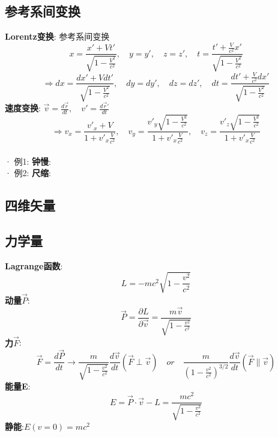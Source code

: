 \documentclass{article}
\begin{document}
\subsection{参考系间变换}
\textbf{Lorentz变换}: 参考系间变换
$$ x = \frac{x' + V t'}{\sqrt{1 - \frac{V^2}{c^2}}},\quad y=y',\quad z=z', \quad t = \frac{t'+ \frac{V}{c^2}x'}{\sqrt{1 - \frac{V^2}{c^2}}}$$
$$ \Rightarrow dx = \frac{dx' + V dt'}{\sqrt{1 - \frac{V^2}{c^2}}},\quad dy=dy',\quad dz=dz', \quad dt = \frac{dt'+ \frac{V}{c^2}dx'}{\sqrt{1 - \frac{V^2}{c^2}}}$$
\textbf{速度变换}: $\vec v = \frac{d\vec r}{dt},\quad v' = \frac{d\vec r'}{dt}$
$$\Rightarrow v_x = \frac{v'_x + V}{1 + v'_x \frac{V}{c^2}}, \quad v_y = \frac{v'_y \sqrt{1 - \frac{V^2}{c^2}}}{1 + v'_x \frac{V}{c^2}},\quad v_z = \frac{v'_z \sqrt{1 - \frac{V^2}{c^2}}}{1 + v'_x \frac{V}{c^2}}$$\\
· 例1: \textbf{钟慢}:\\
· 例2: \textbf{尺缩}:\\


\subsection{四维矢量}


\subsection{力学量}
\textbf{Lagrange函数}:
$$L = -m c^2 \sqrt{1 - \frac{v^2}{c^2}}$$
\textbf{动量$\vec P$}:
$$\vec P = \frac{\partial L}{\partial \vec v} = \frac{m \vec v}{\sqrt{1 - \frac{v^2}{c^2}}}$$
\textbf{力$\vec F$}:
$$\vec F = \frac{d\vec P}{dt} \to \frac{m}{\sqrt{1 - \frac{v^2}{c^2}}} \frac{d\vec v}{dt}(\vec F \perp \vec v) \quad or\quad  \frac{m}{(1 - \frac{v^2}{c^2})^{3/2}} \frac{d\vec v}{dt} (\vec F \parallel \vec v)$$
\textbf{能量E}:
$$E = \vec P \cdot \vec v - L = \frac{mc^2}{\sqrt{1 - \frac{v^2}{c^2}}}$$
\textbf{静能}:\quad $E(v=0) = mc^2$\\



\section{}
\end{document}
